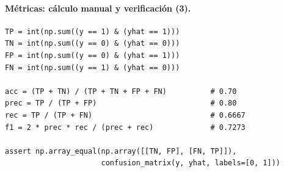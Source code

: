 \documentclass[11pt,a4paper]{article}
\begin{document}
\paragraph{Métricas: cálculo manual y verificación (3).}
\begin{lstlisting}
TP = int(np.sum((y == 1) & (yhat == 1)))
TN = int(np.sum((y == 0) & (yhat == 0)))
FP = int(np.sum((y == 0) & (yhat == 1)))
FN = int(np.sum((y == 1) & (yhat == 0)))

acc = (TP + TN) / (TP + TN + FP + FN)          # 0.70
prec = TP / (TP + FP)                          # 0.80
rec = TP / (TP + FN)                           # 0.6667
f1 = 2 * prec * rec / (prec + rec)             # 0.7273

assert np.array_equal(np.array([[TN, FP], [FN, TP]]),
                      confusion_matrix(y, yhat, labels=[0, 1]))
\end{lstlisting}
\end{document}
